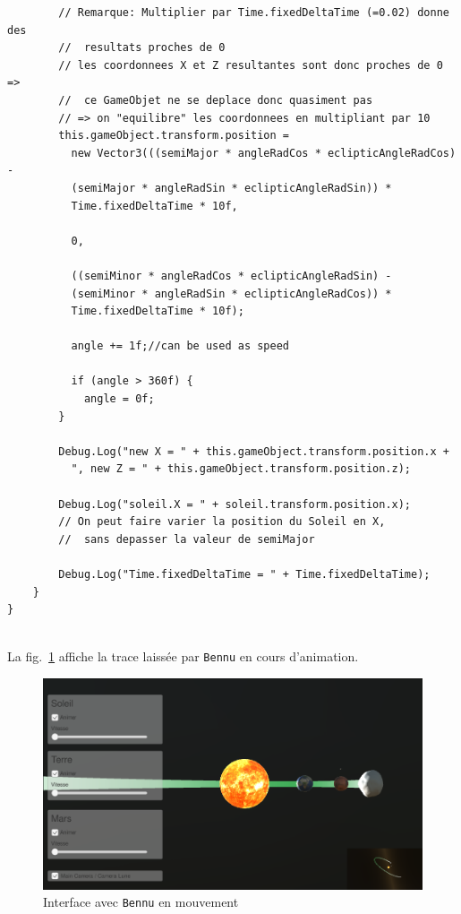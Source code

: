 \documentclass[a4paper,10pt]{article}
\newenvironment{solution}%
{\begin{tcolorbox}[breakable,colback=red!5!white,colframe=red!75!black,title=Solution]}%
{\end{tcolorbox}}
\begin{document}
\begin{solution}
\begin{lstlisting}
		// Remarque: Multiplier par Time.fixedDeltaTime (=0.02) donne des 
		//  resultats proches de 0
		// les coordonnees X et Z resultantes sont donc proches de 0 => 
		//  ce GameObjet ne se deplace donc quasiment pas
		// => on "equilibre" les coordonnees en multipliant par 10
		this.gameObject.transform.position = 
		  new Vector3(((semiMajor * angleRadCos * eclipticAngleRadCos) - 
		  (semiMajor * angleRadSin * eclipticAngleRadSin)) * 
		  Time.fixedDeltaTime * 10f,
		
		  0,
		  
		  ((semiMinor * angleRadCos * eclipticAngleRadSin) - 
		  (semiMinor * angleRadSin * eclipticAngleRadCos)) * 
		  Time.fixedDeltaTime * 10f);
		  
		  angle += 1f;//can be used as speed
		  
		  if (angle > 360f) {
			angle = 0f;
		}
		
		Debug.Log("new X = " + this.gameObject.transform.position.x + 
		  ", new Z = " + this.gameObject.transform.position.z);
		
		Debug.Log("soleil.X = " + soleil.transform.position.x); 
		// On peut faire varier la position du Soleil en X, 
		//  sans depasser la valeur de semiMajor
		
		Debug.Log("Time.fixedDeltaTime = " + Time.fixedDeltaTime);
	}
}
	
\end{lstlisting}

La fig.~\ref{fig:bennu-ellipse} affiche la trace laissée par \texttt{Bennu} en cours d'animation.
\end{solution}
\begin{figure}[!h]
	\begin{center}
		\includegraphics[scale=.50]{fig/bennu-ellipse}
		\caption{Interface avec \texttt{Bennu} en mouvement}
		\label{fig:bennu-ellipse}
	\end{center}
\end{figure}
\fi 
\end{document}
